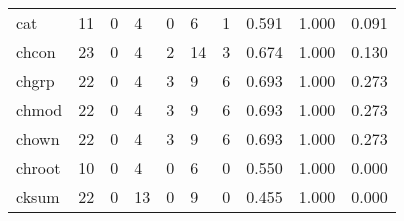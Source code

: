 \begin{longtable}{lp{1.3cm}p{1.3cm}p{1.3cm}p{1.3cm}p{1.3cm}p{1.3cm}p{1.3cm}p{1.3cm}p{1.3cm}}
cat       &                     11 &                                             0 &                                            4 &                                           0 &                                            6 &                                          1 &                                0.591 &                                  1.000 &                                0.091 \\
chcon     &                     23 &                                             0 &                                            4 &                                           2 &                                           14 &                                          3 &                                0.674 &                                  1.000 &                                0.130 \\
chgrp     &                     22 &                                             0 &                                            4 &                                           3 &                                            9 &                                          6 &                                0.693 &                                  1.000 &                                0.273 \\
chmod     &                     22 &                                             0 &                                            4 &                                           3 &                                            9 &                                          6 &                                0.693 &                                  1.000 &                                0.273 \\
chown     &                     22 &                                             0 &                                            4 &                                           3 &                                            9 &                                          6 &                                0.693 &                                  1.000 &                                0.273 \\
chroot    &                     10 &                                             0 &                                            4 &                                           0 &                                            6 &                                          0 &                                0.550 &                                  1.000 &                                0.000 \\
cksum     &                     22 &                                             0 &                                           13 &                                           0 &                                            9 &                                          0 &                                0.455 &                                  1.000 &                                0.000 \\

\end{longtable}
